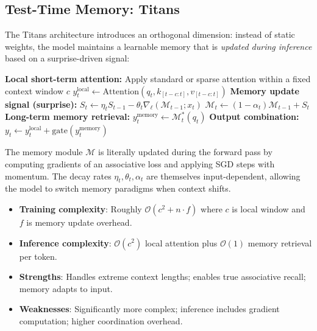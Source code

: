 \documentclass[11pt,a4paper]{article}
\begin{document}
\subsection{Test-Time Memory: Titans}

The Titans architecture \citep{behrouz_titans_2025} introduces an orthogonal dimension: instead of static weights, the model maintains a learnable memory that is \textit{updated during inference} based on a surprise-driven signal:

\begin{algorithmic}[1]
\State \textbf{Local short-term attention:} Apply standard or sparse attention within a fixed context window $c$
\State $y_t^{\text{local}} \gets \text{Attention}(q_t, k_{[t-c:t]}, v_{[t-c:t]})$
\State \textbf{Memory update signal (surprise):}
\State $S_t \gets \eta_t S_{t-1} - \theta_t \nabla_\ell(\mathcal{M}_{t-1}; x_t)$ 
\State $\mathcal{M}_t \gets (1 - \alpha_t) \mathcal{M}_{t-1} + S_t$ 
\State \textbf{Long-term memory retrieval:}
\State $y_t^{\text{memory}} \gets \mathcal{M}_t^* (q_t)$ 
\State \textbf{Output combination:}
\State $y_t \gets y_t^{\text{local}} + \text{gate}(y_t^{\text{memory}})$ 
\end{algorithmic}

The memory module $\mathcal{M}$ is literally updated during the forward pass by computing gradients of an associative loss and applying SGD steps with momentum. The decay rates $\eta_t, \theta_t, \alpha_t$ are themselves input-dependent, allowing the model to switch memory paradigms when context shifts.

\begin{itemize}[leftmargin=*]
    \item \textbf{Training complexity}: Roughly $\mathcal{O}(c^2 + n \cdot f)$ where $c$ is local window and $f$ is memory update overhead.
    \item \textbf{Inference complexity}: $\mathcal{O}(c^2)$ local attention plus $\mathcal{O}(1)$ memory retrieval per token.
    \item \textbf{Strengths}: Handles extreme context lengths; enables true associative recall; memory adapts to input.
    \item \textbf{Weaknesses}: Significantly more complex; inference includes gradient computation; higher coordination overhead.
\end{itemize}
\end{document}

